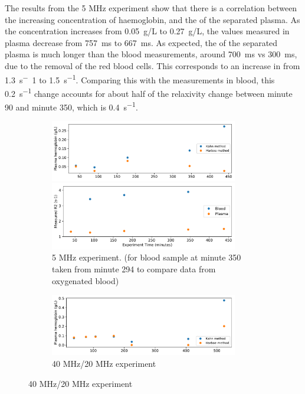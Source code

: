 The results from the 5 MHz experiment show that there is a correlation between the increasing concentration of haemoglobin, and the \Rtwo of the separated plasma.
As the concentration increases from \SI{0.05}{g/L} to \SI{0.27}{g/L}, the \Ttwo values measured in plasma decrease from \SI{757}{ms} to \SI{667}{ms}.
As expected, the \Ttwo of the separated plasma is much longer than the blood measurements, around \SI{700}{ms} vs \SI{300}{ms}, due to the removal of the red blood cells.
This corresponds to an increase in \Rtwo from \SI{1.3}{s^-1} to \SI{1.5}{s^{-1}}.
Comparing this with the \Rtwo measurements in blood, this \SI{0.2}{s^{-1}} change accounts for about half of the relaxivity change between minute 90 and minute 350, which is \SI{0.4}{s^{-1}}.

\begin{figure}[h!tp]
\centering
\begin{subfigure}{\textwidth}
\caption{5 MHz experiment. (\Ttwo for blood sample at minute 350 taken from minute 294 to compare data from oxygenated blood)}
\includegraphics[width=0.9\textwidth]{figures/contflow/haemolyseSpect.pdf}

\includegraphics[width=0.9\textwidth]{figures/contflow/haemolysePlasT2.pdf}
\end{subfigure}

\begin{subfigure}{\textwidth}
\caption{40 MHz/20 MHz experiment}
\includegraphics[width=0.9\textwidth]{figures/contflow/40haemolyseSpect.pdf}


\end{subfigure}
\end{figure}

